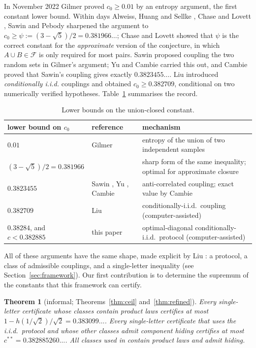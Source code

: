 \documentclass[11pt,a4paper]{article}
\newtheorem{theorem}{Theorem}[section]
\theoremstyle{definition}
\theoremstyle{remark}
\newcommand{\F}{\mathcal{F}}
\newcommand{\ent}{h}
\begin{document}
In November 2022 Gilmer \cite{Gilmer} proved $c_0\ge0.01$ by an entropy argument, the first constant lower bound. Within days Alweiss, Huang and Sellke \cite{AHS}, Chase and Lovett \cite{CL}, Sawin \cite{Sawin} and Pebody \cite{Pebody} sharpened the argument to $c_0\ge\psi:=(3-\sqrt5)/2=0.381966\ldots$; Chase and Lovett showed that $\psi$ is the correct constant for the \emph{approximate} version of the conjecture, in which $A\cup B\in\F$ is only required for most pairs. Sawin proposed coupling the two random sets in Gilmer's argument; Yu \cite{Yu} and Cambie \cite{Cambie} carried this out, and Cambie proved that Sawin's coupling gives exactly $0.3823455\ldots$. Liu \cite{Liu} introduced \emph{conditionally i.i.d.} couplings and obtained $c_0\ge0.382709$, conditional on two numerically verified hypotheses. Table~\ref{tab:history} summarises the record.

\begin{table}[h]\centering\small
\begin{tabular}{llp{5.6cm}}\toprule
lower bound on $c_0$ & reference & mechanism\\\midrule
$0.01$ & Gilmer \cite{Gilmer} & entropy of the union of two independent samples\\
$(3-\sqrt5)/2=0.381966$ & \cite{AHS,CL,Sawin,Pebody} & sharp form of the same inequality; optimal for approximate closure\\
$0.3823455$ & Sawin \cite{Sawin}, Yu \cite{Yu}, Cambie \cite{Cambie} & anti-correlated coupling; exact value by Cambie\\
$0.382709$ & Liu \cite{Liu} & conditionally-i.i.d.\ coupling (computer-assisted)\\
$0.38284$, and $c<0.382885$ & this paper & optimal-diagonal conditionally-i.i.d.\ protocol (computer-assisted)\\\bottomrule
\end{tabular}
\caption{Lower bounds on the union-closed constant.}\label{tab:history}
\end{table}

All of these arguments have the same shape, made explicit by Liu \cite[Definition~1, Proposition~3]{Liu}: a protocol, a class of admissible couplings, and a single-letter inequality (see Section~\ref{sec:framework}). Our first contribution is to determine the supremum of the constants that this framework can certify.

\begin{theorem}[informal; Theorems~\ref{thm:ceil} and~\ref{thm:refined}]\label{thm:A}
Every single-letter certificate whose classes contain product laws certifies at most $1-\ent(1/\sqrt2)/\sqrt2=0.383099\ldots$. Every single-letter certificate that uses the i.i.d.\ protocol and whose other classes admit component hiding certifies at most $c^{**}=0.382885260\ldots$. All classes used in \cite{Gilmer,AHS,CL,Sawin,Pebody,Yu,Cambie,Liu} contain product laws and admit hiding.
\end{theorem}
\end{document}
